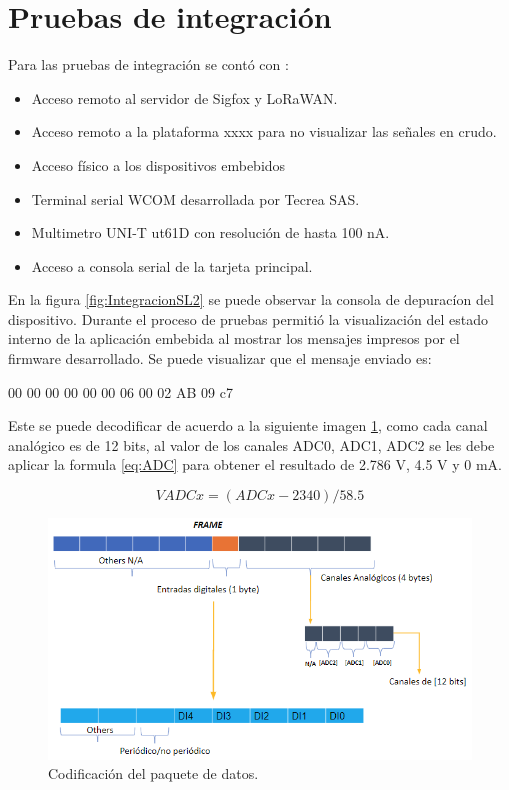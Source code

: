 \section{Pruebas de integración}
Para las pruebas de integración se contó con :
\begin{itemize}
    \item Acceso remoto al servidor de Sigfox y LoRaWAN. 
    \item Acceso remoto a  la plataforma xxxx para no visualizar las señales en crudo.
    \item Acceso físico a los dispositivos embebidos
    \item Terminal serial WCOM desarrollada por Tecrea SAS.
    \item Multimetro UNI-T ut61D con resolución de hasta 100 nA.
    \item Acceso a consola serial de la tarjeta principal.
\end{itemize}

En la figura \ref{fig:IntegracionSL2} se puede observar la consola de depuracíon del dispositivo. Durante el proceso de pruebas permitió la visualización del estado interno de la aplicación embebida al mostrar los mensajes impresos por el firmware desarrollado. Se puede visualizar que el mensaje enviado es:

00 00 00 00 00 00 06 00 02 AB 09 c7 

Este se puede decodificar de acuerdo a la siguiente imagen \ref{fig:FRAME}, como cada canal analógico es de 12 bits, al valor de los canales ADC0, ADC1, ADC2 se les debe aplicar la formula \ref{eq:ADC} para obtener el resultado de 2.786 V, 4.5 V y 0 mA.

\begin{equation}
	\label{eq:ADC}
	VADCx = (ADCx -2340 ) / 58.5
\end{equation}

\begin{figure}[H]
	\centering
	\includegraphics[scale=.6]{./Figures/FRAME.PNG}
	\caption{Codificación del paquete de datos.}
	\label{fig:FRAME}
\end{figure}

